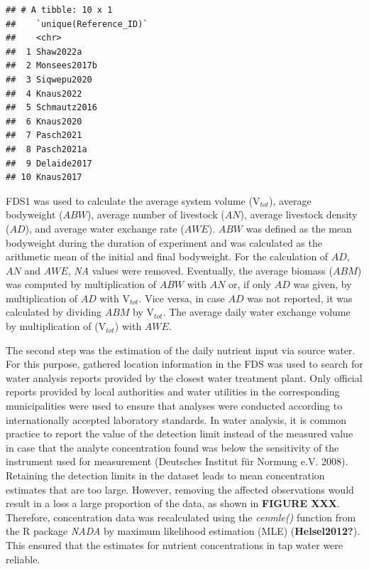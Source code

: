 \documentclass[
]{article}
\begin{document}
\begin{verbatim}
## # A tibble: 10 x 1
##    `unique(Reference_ID)`
##    <chr>                 
##  1 Shaw2022a             
##  2 Monsees2017b          
##  3 Siqwepu2020           
##  4 Knaus2022             
##  5 Schmautz2016          
##  6 Knaus2020             
##  7 Pasch2021             
##  8 Pasch2021a            
##  9 Delaide2017           
## 10 Knaus2017
\end{verbatim}

FDS1 was used to calculate the average system volume (\(\text{V}_{tot}\)), average bodyweight (\(ABW\)), average number of livestock (\(AN\)), average livestock density (\(AD\)), and average water exchange rate (\(AWE\)). \(ABW\) was defined as the mean bodyweight during the duration of experiment and was calculated as the arithmetic mean of the initial and final bodyweight. For the calculation of \(AD\), \(AN\) and \(AWE\), \emph{NA} values were removed.
Eventually, the average biomass (\(ABM\)) was computed by multiplication of \(ABW\) with \(AN\) or, if only \(AD\) was given, by multiplication of \(AD\) with \(\text{V}_{tot}\). Vice versa, in case \(AD\) was not reported, it was calculated by dividing \(ABM\) by \(\text{V}_{tot}\). The average daily water exchange volume by multiplication of (\(\text{V}_{tot}\)) with \(AWE\).

The second step was the estimation of the daily nutrient input via source water. For this purpose, gathered location information in the FDS was used to search for water analysis reports provided by the closest water treatment plant. Only official reports provided by local authorities and water utilities in the corresponding municipalities were used to ensure that analyses were conducted according to internationally accepted laboratory standards.
In water analysis, it is common practice to report the value of the detection limit instead of the measured value in case that the analyte concentration found was below the sensitivity of the instrument used for measurement (Deutsches Institut für Normung e.V. 2008). Retaining the detection limits in the dataset leads to mean concentration estimates that are too large. However, removing the affected observations would result in a loss a large proportion of the data, as shown in \textbf{FIGURE XXX}. Therefore, concentration data was recalculated using the \emph{cenmle()} function from the R package \emph{NADA} by maximum likelihood estimation (MLE) (\textbf{Helsel2012?}). This ensured that the estimates for nutrient concentrations in tap water were reliable.
\end{document}
